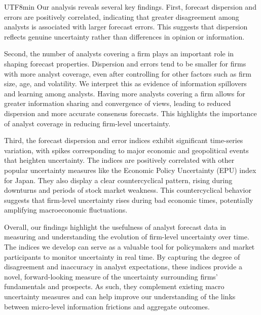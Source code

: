 \documentclass[12pt, a4paper]{article}
\begin{document}
\begin{CJK}{UTF8}{min}
Our analysis reveals several key findings.
First, forecast dispersion and errors are positively correlated, indicating that greater disagreement among analysts
is associated with larger forecast errors.
This suggests that dispersion reflects genuine uncertainty rather than differences in opinion or information.

Second, the number of analysts covering a firm plays an important role in shaping forecast properties.
Dispersion and errors tend to be smaller for firms with more analyst coverage,
even after controlling for other factors such as firm size, age, and volatility.
We interpret this as evidence of information spillovers and learning among analysts. Having more analysts covering a firm allows for greater information sharing and convergence of views, leading to reduced dispersion and more accurate consensus forecasts. This highlights the importance of analyst coverage in reducing firm-level uncertainty.

Third, the forecast dispersion and error indices exhibit significant time-series variation,
with spikes corresponding to major economic and geopolitical events that heighten uncertainty.
The indices are positively correlated with other popular uncertainty measures like
the Economic Policy Uncertainty (EPU) index for Japan. They also display a clear countercyclical pattern,
rising during downturns and periods of stock market weakness. This countercyclical behavior suggests that firm-level uncertainty rises during bad economic times, potentially amplifying macroeconomic fluctuations.

Overall, our findings highlight the usefulness of analyst forecast data
in measuring and understanding the evolution of firm-level uncertainty over time.
The indices we develop can serve as a valuable tool for policymakers and market participants
to monitor uncertainty in real time. By capturing the degree of disagreement and inaccuracy in analyst expectations, these indices provide a novel, forward-looking measure of the uncertainty surrounding firms' fundamentals and prospects. As such, they complement existing macro uncertainty measures and can help improve our understanding of the links between micro-level information frictions and aggregate outcomes.


\end{CJK}
\end{document}
